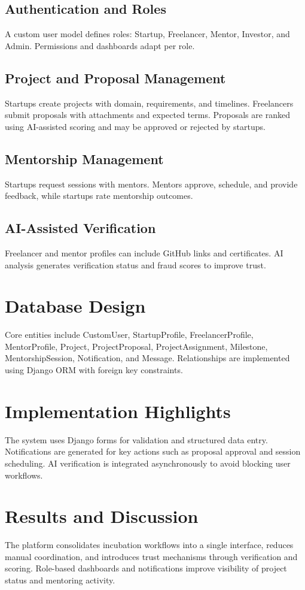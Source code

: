 ﻿\documentclass[journal]{IEEEtran}
\begin{document}
\subsection{Authentication and Roles}
A custom user model defines roles: Startup, Freelancer, Mentor, Investor, and Admin. Permissions and dashboards adapt per role.

\subsection{Project and Proposal Management}
Startups create projects with domain, requirements, and timelines. Freelancers submit proposals with attachments and expected terms. Proposals are ranked using AI-assisted scoring and may be approved or rejected by startups.

\subsection{Mentorship Management}
Startups request sessions with mentors. Mentors approve, schedule, and provide feedback, while startups rate mentorship outcomes.

\subsection{AI-Assisted Verification}
Freelancer and mentor profiles can include GitHub links and certificates. AI analysis generates verification status and fraud scores to improve trust.

\section{Database Design}
Core entities include CustomUser, StartupProfile, FreelancerProfile, MentorProfile, Project, ProjectProposal, ProjectAssignment, Milestone, MentorshipSession, Notification, and Message. Relationships are implemented using Django ORM with foreign key constraints.

\section{Implementation Highlights}
The system uses Django forms for validation and structured data entry. Notifications are generated for key actions such as proposal approval and session scheduling. AI verification is integrated asynchronously to avoid blocking user workflows.

\section{Results and Discussion}
The platform consolidates incubation workflows into a single interface, reduces manual coordination, and introduces trust mechanisms through verification and scoring. Role-based dashboards and notifications improve visibility of project status and mentoring activity.
\end{document}

